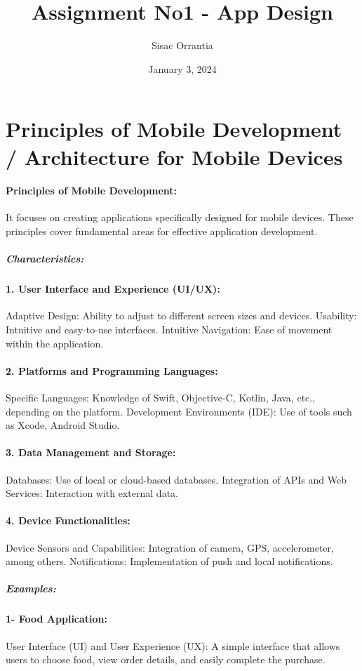 \documentclass{article}
\title {Assignment No1 - App Design}
\author {Sisac Orrantia}
\date {January 3, 2024}
\begin{document}
\maketitle{}
\section{Principles of Mobile Development / Architecture for Mobile Devices}

\paragraph{Principles of Mobile Development:}
It focuses on creating applications specifically designed for mobile devices. These principles cover fundamental areas for effective application development.

\subparagraph{Characteristics:}
\paragraph{1. User Interface and Experience (UI/UX):}
Adaptive Design: Ability to adjust to different screen sizes and devices. Usability: Intuitive and easy-to-use interfaces. Intuitive Navigation: Ease of movement within the application.

\paragraph{2. Platforms and Programming Languages:}
Specific Languages: Knowledge of Swift, Objective-C, Kotlin, Java, etc., depending on the platform. Development Environments (IDE): Use of tools such as Xcode, Android Studio.

\paragraph{3. Data Management and Storage:}
Databases: Use of local or cloud-based databases. Integration of APIs and Web Services: Interaction with external data.

\paragraph{4. Device Functionalities:}
Device Sensors and Capabilities: Integration of camera, GPS, accelerometer, among others. Notifications: Implementation of push and local notifications.

\subparagraph{Examples:}
\paragraph{1- Food Application:}
User Interface (UI) and User Experience (UX): A simple interface that allows users to choose food, view order details, and easily complete the purchase.
\end{document}
